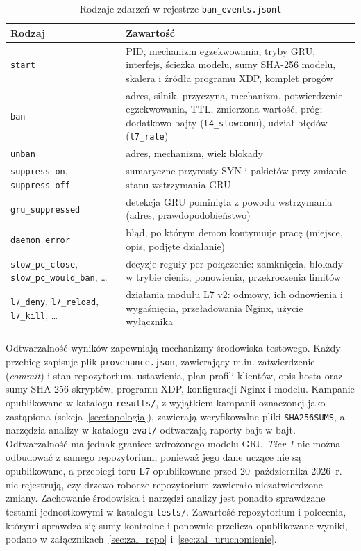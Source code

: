 \documentclass[a4paper,12pt]{article}
\begin{document}
\begin{table}[H]
\centering
\small
\caption{Rodzaje zdarzeń w rejestrze \texttt{ban\_events.jsonl}}\label{tab:zdarzenia}
\begin{tabularx}{\linewidth}{@{}L{3.4cm}Y@{}}
\toprule
Rodzaj & Zawartość \\
\midrule
\texttt{start} & PID, mechanizm egzekwowania, tryby GRU, interfejs, ścieżka modelu, sumy SHA-256 modelu, skalera i źródła programu XDP, komplet progów \\
\texttt{ban} & adres, silnik, przyczyna, mechanizm, potwierdzenie egzekwowania, TTL, zmierzona wartość, próg; dodatkowo bajty (\texttt{l4\_slowconn}), udział błędów (\texttt{l7\_rate}) \\
\texttt{unban} & adres, mechanizm, wiek blokady \\
\texttt{suppress\_on}, \texttt{suppress\_off} & sumaryczne przyrosty SYN i pakietów przy zmianie stanu wstrzymania GRU \\
\texttt{gru\_suppressed} & detekcja GRU pominięta z powodu wstrzymania (adres, prawdopodobieństwo) \\
\texttt{daemon\_error} & błąd, po którym demon kontynuuje pracę (miejsce, opis, podjęte działanie) \\
\texttt{slow\_pc\_close}, \texttt{slow\_pc\_\allowbreak would\_ban}, \ldots & decyzje reguły per połączenie: zamknięcia, blokady w trybie cienia, ponowienia, przekroczenia limitów \\
\texttt{l7\_deny}, \texttt{l7\_reload}, \texttt{l7\_kill}, \ldots & działania modułu L7 v2: odmowy, ich odnowienia i wygaśnięcia, przeładowania Nginx, użycie wyłącznika \\
\bottomrule
\end{tabularx}
\end{table}

Odtwarzalność wyników zapewniają mechanizmy środowiska testowego. Każdy przebieg zapisuje plik \texttt{provenance.json}, zawierający m.in. zatwierdzenie (\textit{commit}) i stan repozytorium, ustawienia, plan profili klientów, opis hosta oraz sumy SHA-256 skryptów, programu XDP, konfiguracji Nginx i modelu. Kampanie opublikowane w katalogu \texttt{results/}, z wyjątkiem kampanii oznaczonej jako zastąpiona (sekcja~\ref{sec:topologia}), zawierają weryfikowalne pliki \texttt{SHA256SUMS}, a narzędzia analizy w katalogu \texttt{eval/} odtwarzają raporty bajt w bajt. Odtwarzalność ma jednak granice: wdrożonego modelu GRU \textit{Tier-1} nie można odbudować z samego repozytorium, ponieważ jego dane uczące nie są opublikowane, a przebiegi toru L7 opublikowane przed 20~października 2026~r. nie rejestrują, czy drzewo robocze repozytorium zawierało niezatwierdzone zmiany. Zachowanie środowiska i narzędzi analizy jest ponadto sprawdzane testami jednostkowymi w katalogu \texttt{tests/}. Zawartość repozytorium i polecenia, którymi sprawdza się sumy kontrolne i ponownie przelicza opublikowane wyniki, podano w załącznikach~\ref{sec:zal_repo} i~\ref{sec:zal_uruchomienie}.
\end{document}
